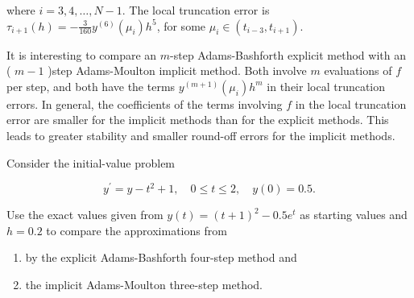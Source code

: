 where $i=3,4, \ldots, N-1$. The local truncation error is $\tau_{i+1}(h)=-\frac{3}{160} y^{(6)}\left(\mu_{i}\right) h^{5}$, for some $\mu_{i} \in\left(t_{i-3}, t_{i+1}\right)$.

It is interesting to compare an $m$-step Adams-Bashforth explicit method with an ( $m-1$ )step Adams-Moulton implicit method. Both involve $m$ evaluations of $f$ per step, and both have the terms $y^{(m+1)}\left(\mu_{i}\right) h^{m}$ in their local truncation errors. In general, the coefficients of the terms involving $f$ in the local truncation error are smaller for the implicit methods than for the explicit methods. This leads to greater stability and smaller round-off errors for the implicit methods.

\begin{example}\label{exam:multistepexm4}
Consider the initial-value problem

$$
y^{\prime}=y-t^{2}+1, \quad 0 \leq t \leq 2, \quad y(0)=0.5 .
$$

Use the exact values given from $y(t)=(t+1)^{2}-0.5 e^{t}$ as starting values and $h=0.2$ to compare the approximations from 
\begin{enumerate}[label=(\alph*)]
\item by the explicit Adams-Bashforth four-step method and 
\item the implicit Adams-Moulton three-step method.
\end{enumerate}
\end{example}

